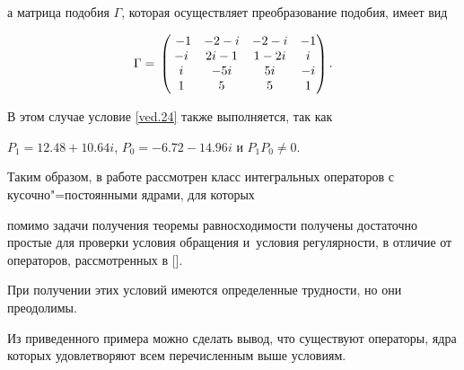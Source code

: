 а матрица подобия $\Gamma$, которая осуществляет преобразование подобия, имеет вид

$$

\Gamma=\\

\begin{pmatrix}

\ -1 & -2-i & -2-i & -1 \\

-i & 2i-1 & 1-2i & i\\

i & -5i & 5i & -i\\

1 & 5 & 5 & 1

\end{pmatrix}.$$



В этом случае условие \eqref{ved.24} также выполняется, так как 

$P_1=12.48+10.64i$, $P_0=-6.72-14.96i$ и $P_1P_0 \neq 0$. 



\smallskip




Таким образом, в работе рассмотрен класс интегральных операторов с кусочно"=постоянными ядрами, для которых 

помимо задачи получения теоремы равносходимости получены  достаточно простые для проверки условия обращения и~условия регулярности, в отличие от операторов, рассмотренных в []. 

При получении этих условий имеются определенные трудности, но они преодолимы. 

Из приведенного примера можно сделать вывод, что существуют операторы, ядра которых удовлетворяют всем перечисленным выше условиям.

















